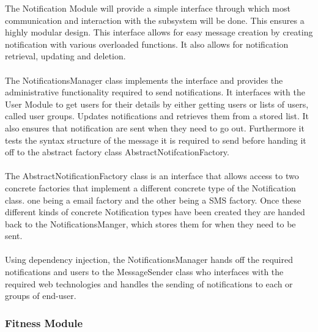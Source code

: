\documentclass{article}
\begin{document}
			{The Notification Module will provide a simple interface through which most communication and interaction with the subsystem will be done. This ensures a highly modular design. This interface allows for easy message creation by creating notification with various overloaded functions. It also allows for notification retrieval, updating and deletion.\\ \\The NotificationsManager class implements the interface and provides the administrative functionality required to send notifications. It interfaces with the User Module to get users for their details by either getting users or lists of users, called user groups. Updates notifications and retrieves them from a stored list. It also ensures that notification are sent when they need to go out. Furthermore it tests the syntax structure of the message it is required to send before handing it off to the abstract factory class AbstractNotifcationFactory.\\ \\The AbstractNotificationFactory class is an interface that allows access to two concrete factories that implement a different concrete type of the Notification class. one being a email factory and the other being a SMS factory. Once these different kinds of concrete Notification types have been created they are handed back to the NotificationsManger, which stores them for when they need to be sent.\\\\Using dependency injection, the NotificationsManager hands off the required notifications and users to the MessageSender class who interfaces with the required web technologies and handles the sending of notifications to each  or groups of end-user.}
			
			
		\subsubsection{Fitness Module}
\end{document}
